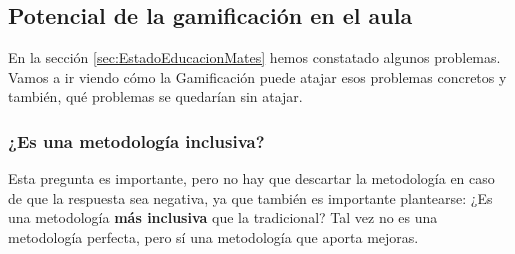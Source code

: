 \subsection{Potencial de la gamificación en el aula}

En la sección \ref{sec:EstadoEducacionMates} hemos constatado algunos problemas. 
%
Vamos a ir viendo cómo la Gamificación puede atajar esos problemas concretos y también, qué problemas se quedarían sin atajar.

\subsubsection{¿Es una metodología inclusiva?}

Esta pregunta es importante, pero no hay que descartar la metodología en caso de que la respuesta sea negativa, ya que también es importante plantearse:  ¿Es una metodología \textbf{más inclusiva} que la tradicional?
%
Tal vez no es una metodología perfecta, pero sí una metodología que aporta mejoras.

